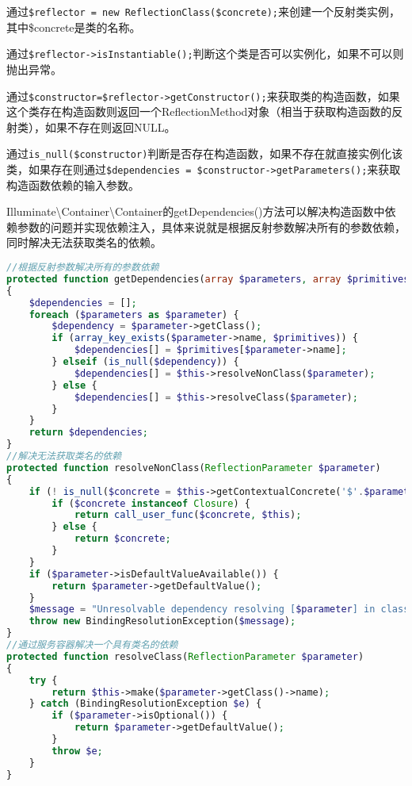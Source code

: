 \begin{compactitem}
\item 通过\texttt{\$reflector = new ReflectionClass(\$concrete);}来创建一个反射类实例，其中\$concrete是类的名称。
\item 通过\texttt{\$reflector->isInstantiable();}判断这个类是否可以实例化，如果不可以则抛出异常。
\item 通过\texttt{\$constructor=\$reflector->getConstructor();}来获取类的构造函数，如果这个类存在构造函数则返回一个ReflectionMethod对象（相当于获取构造函数的反射类），如果不存在则返回NULL。
\item 通过\texttt{is\_null(\$constructor)}判断是否存在构造函数，如果不存在就直接实例化该类，如果存在则通过\texttt{\$dependencies = \$constructor->getParameters();}来获取构造函数依赖的输入参数。
\end{compactitem}


Illuminate\textbackslash Container\textbackslash Container的getDependencies()方法可以解决构造函数中依赖参数的问题并实现依赖注入，具体来说就是根据反射参数解决所有的参数依赖，同时解决无法获取类名的依赖。



\begin{lstlisting}[language=PHP]
//根据反射参数解决所有的参数依赖
protected function getDependencies(array $parameters, array $primitives = [])
{
    $dependencies = [];
    foreach ($parameters as $parameter) {
        $dependency = $parameter->getClass();
        if (array_key_exists($parameter->name, $primitives)) {
            $dependencies[] = $primitives[$parameter->name];
        } elseif (is_null($dependency)) {
            $dependencies[] = $this->resolveNonClass($parameter);
        } else {
            $dependencies[] = $this->resolveClass($parameter);
        }
    }
    return $dependencies;
}
//解决无法获取类名的依赖
protected function resolveNonClass(ReflectionParameter $parameter)
{
    if (! is_null($concrete = $this->getContextualConcrete('$'.$parameter->name))) {
        if ($concrete instanceof Closure) {
            return call_user_func($concrete, $this);
        } else {
            return $concrete;
        }
    }
    if ($parameter->isDefaultValueAvailable()) {
        return $parameter->getDefaultValue();
    }
    $message = "Unresolvable dependency resolving [$parameter] in class {$parameter->getDeclaringClass()->getName()}";
    throw new BindingResolutionException($message);
}
//通过服务容器解决一个具有类名的依赖
protected function resolveClass(ReflectionParameter $parameter)
{
    try {
        return $this->make($parameter->getClass()->name);
    } catch (BindingResolutionException $e) {
        if ($parameter->isOptional()) {
            return $parameter->getDefaultValue();
        }
        throw $e;
    }
}
\end{lstlisting}


